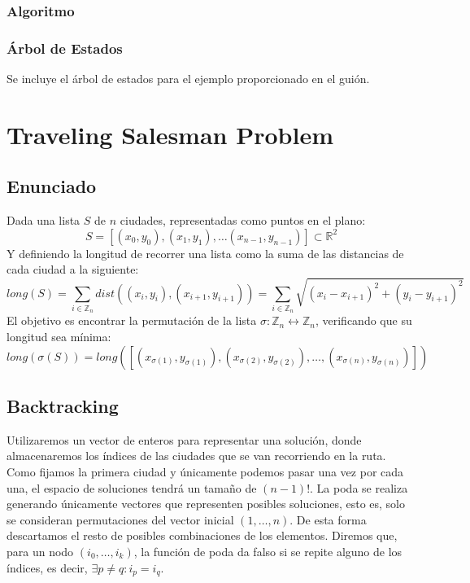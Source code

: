 \documentclass[a4paper, 11pt]{article} %
\begin{document}
	  \subsubsection{Algoritmo}
	    
	    \small
	    \texttt{}
	    \normalsize

	\subsubsection{Árbol de Estados}
	Se incluye el árbol de estados para el ejemplo proporcionado en el guión. 
    
    \tiny
	   	\texttt{}
    \normalsize
        
    
    \section{Traveling Salesman Problem}
      \subsection{Enunciado}
	Dada una lista $S$ de $n$ ciudades, representadas como puntos en el plano:
	\begin{equation}
	    S = [(x_0,y_0), (x_1,y_1), \dots (x_{n-1},y_{n-1})] \subset \mathbb{R}^2
	\end{equation}
	Y definiendo la longitud de recorrer una lista como la suma de las distancias de cada ciudad a la siguiente:
	\begin{equation}
	    long(S) = \sum_{i \in \mathbb{Z}_n} dist((x_i,y_i), (x_{i+1}, y_{i+1})) = \sum_{i \in \mathbb{Z}_n} \sqrt{(x_i-x_{i+1})^2 + (y_i-y_{i+1})^2}
	\end{equation}
	El objetivo es encontrar la permutación de la lista $\sigma : \mathbb{Z}_n \leftrightarrow \mathbb{Z}_n$, verificando que su longitud sea mínima:
	\begin{equation}
	    long(\sigma(S)) = long([(x_{\sigma(1)},y_{\sigma(1)}), (x_{\sigma(2)},y_{\sigma(2)}), \dots, (x_{\sigma(n)},y_{\sigma(n)})])
    \end{equation}
    
      \subsection{Backtracking}
	Utilizaremos un vector de enteros para representar una solución, donde almacenaremos los 
	índices de las ciudades que se van recorriendo en la ruta. Como fijamos la primera ciudad 
	y únicamente podemos pasar una vez por cada una, el espacio de soluciones tendrá un tamaño 
	de $(n-1)!$.
	La poda se realiza generando únicamente vectores que representen posibles soluciones, esto es, 
	solo se consideran permutaciones del vector inicial $(1,\dots,n)$. De esta forma descartamos el 
	resto de posibles combinaciones de los elementos. Diremos que, para un nodo $(i_0, \dots, i_k)$, 
	la función de poda da falso si se repite alguno de los índices, es decir, $\exists p\ne q : i_p = i_q$.
    
\end{document}
